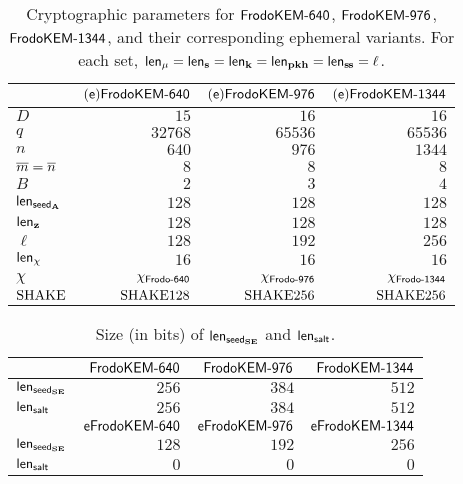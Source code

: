 \begin{table}[h]
\caption{Cryptographic parameters for $\FrodoKEMLOne$, $\FrodoKEMLThree$, $\FrodoKEMLFive$, and
their corresponding ephemeral variants.
For each set, $\lengthm = \lengths = \lengthK = \lengthpkhash = \lengthss = \ell$.}\label{tab:parameters-all}
\begin{center}
\begin{tabular}{l|r|r|r }
\toprule
& $(\styleScheme{e})\FrodoKEMLOne$ & $(\styleScheme{e})\FrodoKEMLThree$ & $(\styleScheme{e})\FrodoKEMLFive$ \\
\midrule
$D$ & $15$ & $16$ & $16$ \\
$q$ & $32768$ & $65536$ & $65536$ \\
$n$ & $640$ & $976$ & $1344$ \\
$\mbar=\nbar$ & $8$ & $8$ & $8$ \\
$B$ & $2$ & $3$ & $4$ \\
$\lengthseedA$ & $128$ & $128$ & $128$ \\
$\lengthz$ & $128$ & $128$ & $128$ \\
$\ell$ & $128$ & $192$ & $256$ \\
$\lengthchi$ & $16$ & $16$ & $16$ \\
$\chi$ & $\chi_\FrodoLOne$ & $\chi_\FrodoLThree$ & $\chi_\FrodoLFive$ \\
$\SHAKE$ & $\SHAKE128$ & $\SHAKE256$ & $\SHAKE256$ \\
\bottomrule
\end{tabular}
\end{center}
\end{table}

\begin{table}[h]
\caption{Size (in bits) of $\lengthseedSE$ and $\lengthsalt$.}\label{tab:parameters-additional}
\begin{center}
\begin{tabular}{l|r|r|r }
\toprule
& $\FrodoKEMLOne$ & $\FrodoKEMLThree$ & $\FrodoKEMLFive$ \\
\midrule
$\lengthseedSE$ & $256$ & $384$ & $512$ \\
$\lengthsalt$ & $256$ & $384$ & $512$ \\
\toprule
& $\eFrodoKEMLOne$ & $\eFrodoKEMLThree$ & $\eFrodoKEMLFive$ \\
\midrule
$\lengthseedSE$ & $128$ & $192$ & $256$ \\
$\lengthsalt$ & $0$ & $0$ & $0$ \\
\bottomrule
\end{tabular}
\end{center}
\end{table}


